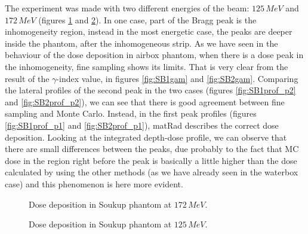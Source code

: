 \documentclass[12pt, a4paper, twoside]{book}
\begin{document}
The experiment was made with two different energies of the beam: $125\,MeV$ and $172\,MeV$ (figures \ref{fig:SB1} and \ref{fig:SB2}). In one case, part of the Bragg peak is the inhomogeneity region, instead in the most energetic case, the peaks are deeper inside the phantom, after the inhomogeneous strip.
As we have seen in the behaviour of the dose deposition in airbox phantom, when there is a dose peak in the inhomogeneity, fine sampling shows its limits.
That is very clear from the result of the $\gamma$-index value, in figures \ref{fig:SB1gam} and \ref{fig:SB2gam}.
Comparing the lateral profiles of the second peak in the two cases (figures \ref{fig:SB1prof_p2} and \ref{fig:SB2prof_p2}), we can see that there is good agreement between fine sampling and Monte Carlo. Instead, in the first peak profiles (figures \ref{fig:SB1prof_p1} and \ref{fig:SB2prof_p1}), matRad describes the correct dose deposition. Looking at the integrated depth-dose profile, we can observe that there are small differences between the peaks, due probably to the fact that MC dose in the region right before the peak is basically a little higher than the dose calculated by using the other methods (as we have already seen in the waterbox case) and this phenomenon is here more evident.
\begin{figure}[!t]
\centering
{}\quad
{}\quad
{}\quad
\caption{Dose deposition in Soukup phantom at $172\,MeV$.}
\label{fig:SB1}
\end{figure}
\begin{figure}[!t]
\centering
{}\quad
{}\quad
{}\quad
\caption{Dose deposition in Soukup phantom at $125\,MeV$.}
\label{fig:SB2}
\end{figure}
\end{document}
